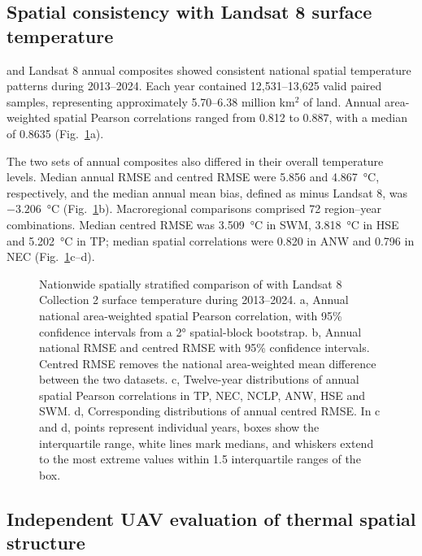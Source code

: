 \subsection{Spatial consistency with Landsat 8 surface temperature}

\chinatherm{} and Landsat 8 annual composites showed consistent national spatial temperature patterns during 2013--2024. Each year contained 12,531--13,625 valid paired samples, representing approximately 5.70--6.38 million km$^2$ of land. Annual area-weighted spatial Pearson correlations ranged from 0.812 to 0.887, with a median of 0.8635 (Fig.~\ref*{fig:satellite-comparison}a).

The two sets of annual composites also differed in their overall temperature levels. Median annual RMSE and centred RMSE were 5.856 and 4.867~°C, respectively, and the median annual mean bias, defined as \chinatherm{} minus Landsat 8, was $-3.206$~°C (Fig.~\ref*{fig:satellite-comparison}b). Macroregional comparisons comprised 72 region--year combinations. Median centred RMSE was 3.509~°C in SWM, 3.818~°C in HSE and 5.202~°C in TP; median spatial correlations were 0.820 in ANW and 0.796 in NEC (Fig.~\ref*{fig:satellite-comparison}c--d).

\begin{figure}[H]
\centering
{}
\ReviewFloatBegin
\caption{Nationwide spatially stratified comparison of \chinatherm{} with Landsat 8 Collection 2 surface temperature during 2013--2024. a, Annual national area-weighted spatial Pearson correlation, with 95\% confidence intervals from a 2° spatial-block bootstrap. b, Annual national RMSE and centred RMSE with 95\% confidence intervals. Centred RMSE removes the national area-weighted mean difference between the two datasets. c, Twelve-year distributions of annual spatial Pearson correlations in TP, NEC, NCLP, ANW, HSE and SWM. d, Corresponding distributions of annual centred RMSE. In c and d, points represent individual years, boxes show the interquartile range, white lines mark medians, and whiskers extend to the most extreme values within 1.5 interquartile ranges of the box.}
\label{fig:satellite-comparison}
\ReviewFloatEnd
\end{figure}

\subsection{Independent UAV evaluation of thermal spatial structure}


